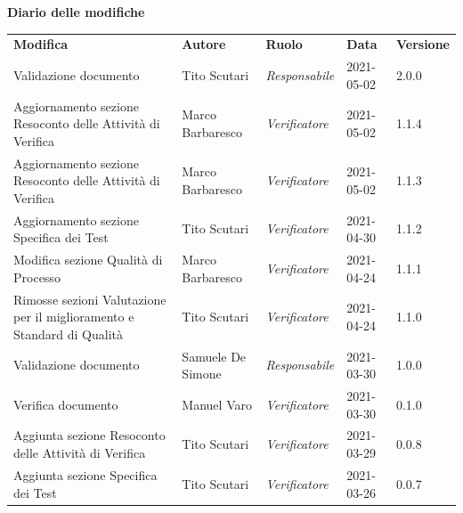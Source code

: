 \documentclass[a4paper]{article}
\begin{document}
\begin{center}
    \textbf{\Large Diario delle modifiche}\\
    \vspace{10px}
    \begin{table}[h!]
        \centering
        \renewcommand{\arraystretch}{1.8}
        \begin{tabular}{p{150px} p{90px} p{60px} p{60px} p{45px}}
            \rowcolor{logo!70} \textbf{Modifica}                                   & \textbf{Autore}   & \textbf{Ruolo}        & \textbf{Data} & \textbf{Versione} \\
            Validazione documento                                                  & Tito Scutari      & \textit{Responsabile} & 2021-05-02    & 2.0.0             \\
            Aggiornamento sezione Resoconto delle Attività di Verifica             & Marco Barbaresco  & \textit{Verificatore} & 2021-05-02    & 1.1.4             \\
            Aggiornamento sezione Resoconto delle Attività di Verifica             & Marco Barbaresco  & \textit{Verificatore} & 2021-05-02    & 1.1.3             \\
            Aggiornamento sezione Specifica dei Test                               & Tito Scutari      & \textit{Verificatore} & 2021-04-30    & 1.1.2             \\
            Modifica sezione Qualità di Processo                                   & Marco Barbaresco  & \textit{Verificatore} & 2021-04-24    & 1.1.1             \\
            Rimosse sezioni Valutazione per il miglioramento e Standard di Qualità & Tito Scutari      & \textit{Verificatore} & 2021-04-24    & 1.1.0             \\
            Validazione documento                                                  & Samuele De Simone & \textit{Responsabile} & 2021-03-30    & 1.0.0             \\
            Verifica documento                                                     & Manuel Varo       & \textit{Verificatore} & 2021-03-30    & 0.1.0             \\
            Aggiunta sezione Resoconto delle Attività di Verifica                  & Tito Scutari      & \textit{Verificatore} & 2021-03-29    & 0.0.8             \\
            Aggiunta sezione Specifica dei Test                                    & Tito Scutari      & \textit{Verificatore} & 2021-03-26    & 0.0.7             \\

\end{tabular}
\end{table}
\end{center}
\end{document}
